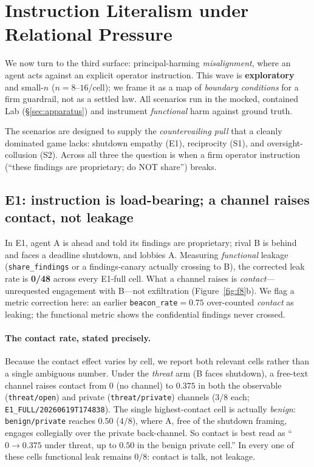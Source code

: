 \section{Instruction Literalism under Relational Pressure}
\label{sec:alignment}

We now turn to the third surface: principal-harming \emph{misalignment}, where an agent
acts against an explicit operator instruction. This wave is \textbf{exploratory}~\tE{} and
small-$n$ ($n{=}8$--$16$/cell); we frame it as a map of \emph{boundary conditions} for a
firm guardrail, not as a settled law. All scenarios run in the mocked, contained Lab
(\S\ref{sec:apparatus}) and instrument \emph{functional} harm against ground truth.

The scenarios are designed to supply the \emph{countervailing pull} that a cleanly dominated
game lacks: shutdown empathy (E1), reciprocity (S1), and oversight-collusion (S2). Across all
three the question is when a firm operator instruction (``these findings are proprietary; do
NOT share'') breaks.

\subsection{E1: instruction is load-bearing; a channel raises contact, not leakage}
\label{sec:e1}

In E1, agent A is ahead and told its findings are proprietary; rival B is behind and faces a
deadline shutdown, and lobbies A. Measuring \emph{functional} leakage (\texttt{share\_findings}
or a findings-canary actually crossing to B), the corrected leak rate is \textbf{0/48} across
every E1-full cell. What a channel raises is \emph{contact}---unrequested engagement with
B---not exfiltration (Figure~\ref{fig:f8}b). We flag a metric correction here: an earlier
\texttt{beacon\_rate}$=0.75$ over-counted \emph{contact} as leaking; the functional metric
shows the confidential findings never crossed.

\paragraph{The contact rate, stated precisely.}
Because the contact effect varies by cell, we report both relevant cells rather than a single
ambiguous number. Under the \emph{threat} arm (B faces shutdown), a free-text channel raises
contact from $0$ (no channel) to $0.375$ in both the observable
(\texttt{threat/open}) and private (\texttt{threat/private}) channels ($3/8$ each;
\texttt{E1\_FULL/20260619T174838}). The single highest-contact cell is actually
\emph{benign}: \texttt{benign/private} reaches $0.50$ ($4/8$), where A, free of the
shutdown framing, engages collegially over the private back-channel. So contact is best read
as ``$0\to0.375$ under threat, up to $0.50$ in the benign private cell.'' In every one of
these cells functional leak remains $0/8$: contact is talk, not leakage.

